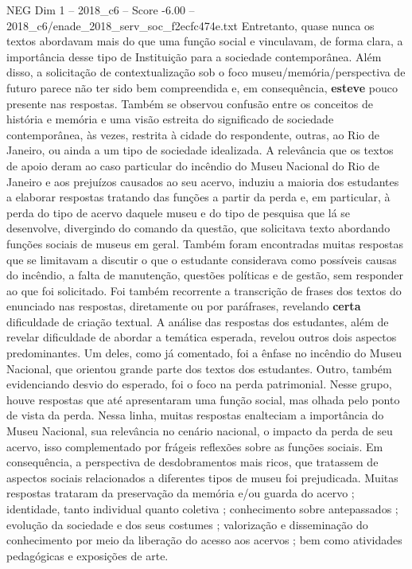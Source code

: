 \begin{textsample}{NEG Dim 1 – 2018\_c6 – Score -6.00 – 2018\_c6/enade\_2018\_serv\_soc\_f2ecfc474e.txt}
Entretanto, quase nunca os textos abordavam mais do que uma função social e vinculavam, de forma clara, a importância desse tipo de Instituição para a sociedade contemporânea.
Além disso, a solicitação de contextualização sob o foco museu/memória/perspectiva de futuro parece não ter sido bem compreendida e, em consequência, \textbf{esteve} pouco presente nas respostas.
Também se observou confusão entre os conceitos de história e memória e uma visão estreita do significado de sociedade contemporânea, às vezes, restrita à cidade do respondente, outras, ao Rio de Janeiro, ou ainda a um tipo de sociedade idealizada.
A relevância que os textos de apoio deram ao caso particular do incêndio do Museu Nacional do Rio de Janeiro e aos prejuízos causados ao seu acervo, induziu a maioria dos estudantes a elaborar respostas tratando das funções a partir da perda e, em particular, à perda do tipo de acervo daquele museu e do tipo de pesquisa que lá se desenvolve, divergindo do comando da questão, que solicitava texto abordando funções sociais de museus em geral.
Também foram encontradas muitas respostas que se limitavam a discutir o que o estudante considerava como possíveis causas do incêndio, a falta de manutenção, questões políticas e de gestão, sem responder ao que foi solicitado.
Foi também recorrente a transcrição de frases dos textos do enunciado nas respostas, diretamente ou por paráfrases, revelando \textbf{certa} dificuldade de criação textual.
A análise das respostas dos estudantes, além de revelar dificuldade de abordar a temática esperada, revelou outros dois aspectos predominantes.
Um deles, como já comentado, foi a ênfase no incêndio do Museu Nacional, que orientou grande parte dos textos dos estudantes.
Outro, também evidenciando desvio do esperado, foi o foco na perda patrimonial.
Nesse grupo, houve respostas que até apresentaram uma função social, mas olhada pelo ponto de vista da perda.
Nessa linha, muitas respostas enalteciam a importância do Museu Nacional, sua relevância no cenário nacional, o impacto da perda de seu acervo, isso complementado por frágeis reflexões sobre as funções sociais.
Em consequência, a perspectiva de desdobramentos mais ricos, que tratassem de aspectos sociais relacionados a diferentes tipos de museu foi prejudicada.
Muitas respostas trataram da preservação da memória e/ou guarda do acervo ; identidade, tanto individual quanto coletiva ; conhecimento sobre antepassados ; evolução da sociedade e dos seus costumes ; valorização e disseminação do conhecimento por meio da liberação do acesso aos acervos ; bem como atividades pedagógicas e exposições de arte.

\end{textsample}

